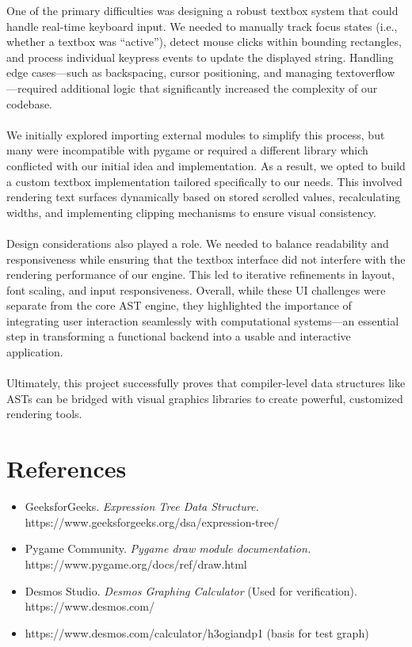 \documentclass{article}
\begin{document}
One of the primary difficulties was designing a robust textbox system that could handle real-time keyboard input. We needed to manually track focus states (i.e., whether a textbox was “active”), detect mouse clicks within bounding rectangles, and process individual keypress events to update the displayed string. Handling edge cases—such as backspacing, cursor positioning, and managing textoverflow—required additional logic that significantly increased the complexity of our codebase. 
\\\\We initially explored importing external modules to simplify this process, but many were incompatible with pygame or required a different library which conflicted with our initial idea and implementation. As a result, we opted to build a custom textbox implementation tailored specifically to our needs. This involved rendering text surfaces dynamically based on stored scrolled values, recalculating widths, and implementing clipping mechanisms to ensure visual consistency.
\\\\Design considerations also played a role. We needed to balance readability and responsiveness while ensuring that the textbox interface did not interfere with the rendering performance of our engine. This led to iterative refinements in layout, font scaling, and input responsiveness. Overall, while these UI challenges were separate from the core AST engine, they highlighted the importance of integrating user interaction seamlessly with computational systems—an essential step in transforming a functional backend into a usable and interactive application.
\\\\Ultimately, this project successfully proves that compiler-level data structures like ASTs can be bridged with visual graphics libraries to create powerful, customized rendering tools.

\section{\textbf{References}}

\begin{itemize}
    \item GeeksforGeeks. \textit{Expression Tree Data Structure.} \\{https://www.geeksforgeeks.org/dsa/expression-tree/}
    \item Pygame Community. \textit{Pygame draw module documentation.} \\{https://www.pygame.org/docs/ref/draw.html}
    \item Desmos Studio. \textit{Desmos Graphing Calculator} (Used for verification). \\{https://www.desmos.com/}
    \item {https://www.desmos.com/calculator/h3ogiandp1} (basis for test graph)
\end{itemize}

 
\end{document}
